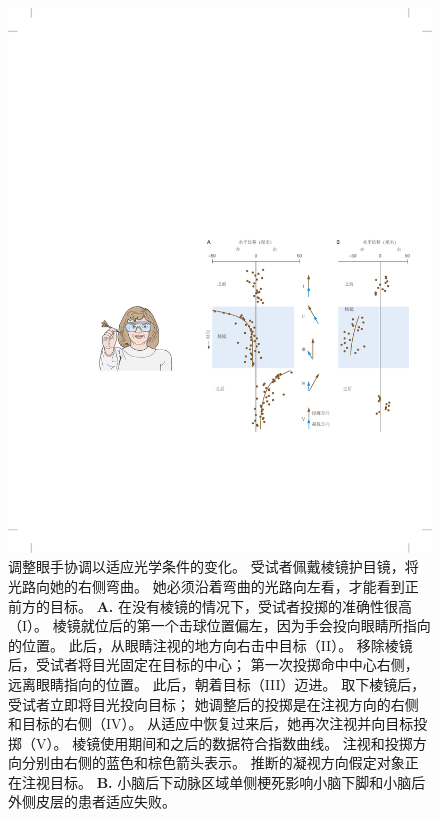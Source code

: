\begin{figure}[htbp]
	\centering
	\includegraphics[width=1.0\linewidth]{chap37/fig_37_12}
	\caption{调整眼手协调以适应光学条件的变化。
		受试者佩戴棱镜护目镜，将光路向她的右侧弯曲。
		她必须沿着弯曲的光路向左看，才能看到正前方的目标\cite{martin1996throwing}。
		\textbf{A.} 在没有棱镜的情况下，受试者投掷的准确性很高（I）。
		棱镜就位后的第一个击球位置偏左，因为手会投向眼睛所指向的位置。
		此后，从眼睛注视的地方向右击中目标（II）。
		移除棱镜后，受试者将目光固定在目标的中心；
		第一次投掷命中中心右侧，远离眼睛指向的位置。
		此后，朝着目标（III）迈进。
		取下棱镜后，受试者立即将目光投向目标；
		她调整后的投掷是在注视方向的右侧和目标的右侧（IV）。
		从适应中恢复过来后，她再次注视并向目标投掷（V）。
		棱镜使用期间和之后的数据符合指数曲线。
		注视和投掷方向分别由右侧的蓝色和棕色箭头表示。
		推断的凝视方向假定对象正在注视目标。
		\textbf{B.} 小脑后下动脉区域单侧梗死影响小脑下脚和小脑后外侧皮层的患者适应失败。}
	\label{fig:37_12}
\end{figure}


